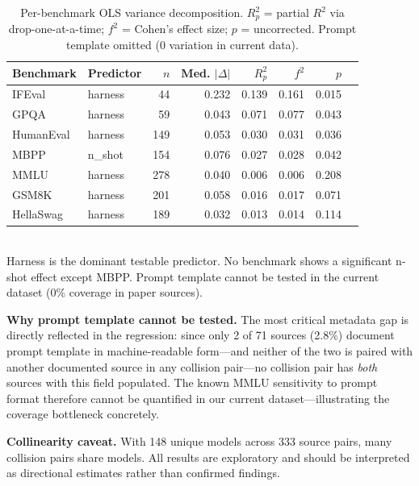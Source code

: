 \documentclass[11pt]{article}
\begin{document}
\begin{table}[t]
\centering
\small
\setlength{\tabcolsep}{3.5pt}
\caption{Per-benchmark OLS variance decomposition.
$R^2_p$ = partial $R^2$ via drop-one-at-a-time; $f^2$ = Cohen's effect
size; $p$ = uncorrected. Prompt template omitted (0 variation in current data).}
\label{tab:variance}
\begin{tabular}{llrrrrrr}
\toprule
\textbf{Benchmark} & \textbf{Predictor} & $n$ & \textbf{Med.} $|\Delta|$ &
  $R^2_{p}$ & $f^2$ & $p$ \\
\midrule
IFEval         & harness   &  44 & 0.232 & 0.139 & 0.161 & 0.015 \\
GPQA           & harness   &  59 & 0.043 & 0.071 & 0.077 & 0.043 \\
HumanEval      & harness   & 149 & 0.053 & 0.030 & 0.031 & 0.036 \\
MBPP           & n\_shot   & 154 & 0.076 & 0.027 & 0.028 & 0.042 \\
MMLU           & harness   & 278 & 0.040 & 0.006 & 0.006 & 0.208 \\
GSM8K          & harness   & 201 & 0.058 & 0.016 & 0.017 & 0.071 \\
HellaSwag      & harness   & 189 & 0.032 & 0.013 & 0.014 & 0.114 \\
\bottomrule
\end{tabular}
\vspace{2pt}\\
\footnotesize Harness is the dominant testable predictor.
No benchmark shows a significant n-shot effect except MBPP.
Prompt template cannot be tested in the current dataset (0\% coverage in paper sources).
\end{table}

\textbf{Why prompt template cannot be tested.}
The most critical metadata gap is directly reflected in the regression:
since only 2 of 71 sources (2.8\%) document prompt template in machine-readable
form---and neither of the two is paired with another documented source in any
collision pair---no collision pair has \emph{both} sources with this field populated.
The known MMLU sensitivity to prompt format
\citep{alzahrani-2024-benchmarks} therefore cannot be quantified in
our current dataset---illustrating the coverage bottleneck concretely.

\textbf{Collinearity caveat.}
With 148 unique models across 333 source pairs, many collision pairs share
models. All results are exploratory and should be interpreted as
directional estimates rather than confirmed findings.
\end{document}
